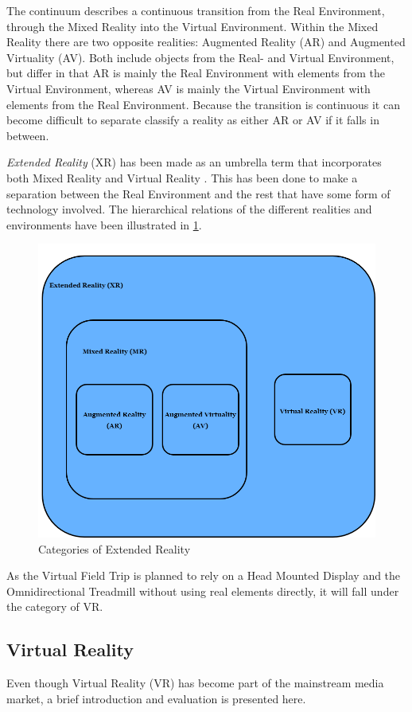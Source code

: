         The continuum describes a continuous transition from the Real Environment, through the Mixed Reality into the Virtual Environment. Within the Mixed Reality there are two opposite realities: Augmented Reality (AR) and Augmented Virtuality (AV). Both include objects from the Real- and Virtual Environment, but differ in that AR is mainly the Real Environment with elements from the Virtual Environment, whereas AV is mainly the Virtual Environment with elements from the Real Environment. Because the transition is continuous it can become difficult to separate classify a reality as either AR or AV if it falls in between.
        
        \emph{Extended Reality} (XR) has been made as an umbrella term that incorporates both Mixed Reality and Virtual Reality \cite{xr}. This has been done to make a separation between the Real Environment and the rest that have some form of technology involved. The hierarchical relations of the different realities and environments have been illustrated in \cref{fig:xr}.
        
        \FloatBarrier
        \begin{figure}[!ht]
            \centering
            \includegraphics[width=0.7\linewidth]{figures/XR.png}
            \caption{Categories of Extended Reality}
            \label{fig:xr}
        \end{figure}
        \FloatBarrier
        
        As the Virtual Field Trip is planned to rely on a Head Mounted Display and the Omnidirectional Treadmill without using real elements directly, it will fall under the category of VR.
    
    \subsection{Virtual Reality}
        Even though Virtual Reality (VR) has become part of the mainstream media market, a brief introduction and evaluation is presented here.
        
